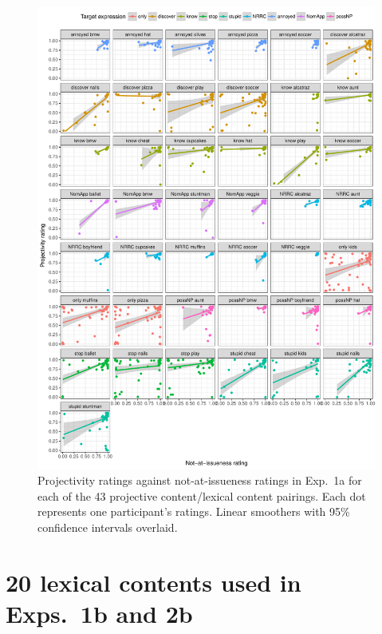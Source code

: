 \documentclass[11pt,fleqn]{article}
\newcommand{\6}{\mbox{$[\hspace*{-.6mm}[$}}
\newcommand{\9}{\mbox{$]\hspace*{-.6mm}]$}}
\begin{document}
\begin{figure}[!h]
\begin{center}

\includegraphics[width=.85\textwidth]{../results/exp1a/graphs/subject-variability-aiproj-exp1a}

\end{center}
\caption{Projectivity ratings against not-at-issueness ratings in Exp.~1a for each of the 43 projective content/lexical content pairings. Each dot represents one participant's ratings. Linear smoothers with 95\% confidence intervals overlaid.}
\label{f-corr}
\end{figure}

\newpage

\section{20 lexical contents used in Exps.~1b and 2b}\label{a-lexcontents1b}
\end{document}

